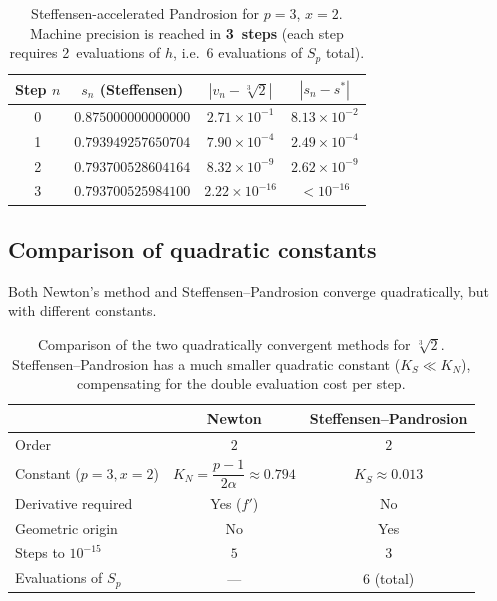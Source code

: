 \documentclass[11pt,a4paper]{article}
\theoremstyle{definition}
\newcommand{\cbrt}[1]{\sqrt[3]{#1}}
\begin{document}
\begin{table}[h]
\centering
\begin{tabular}{cccc}
\toprule
Step $n$ & $s_n$ (Steffensen) & $|v_n - \cbrt{2}|$ & $|s_n - s^*|$ \\
\midrule
0 & $0.875000000000000$ & $2.71 \times 10^{-1}$ & $8.13 \times 10^{-2}$ \\
1 & $0.793949257650704$ & $7.90 \times 10^{-4}$ & $2.49 \times 10^{-4}$ \\
2 & $0.793700528604164$ & $8.32 \times 10^{-9}$ & $2.62 \times 10^{-9}$ \\
3 & $0.793700525984100$ & $2.22 \times 10^{-16}$ & $< 10^{-16}$ \\
\bottomrule
\end{tabular}
\caption{Steffensen-accelerated Pandrosion for $p=3$, $x=2$. Machine precision is reached in \textbf{3~steps} (each step requires 2~evaluations of $h$, i.e.\ 6 evaluations of $S_p$ total).}
\end{table}

\subsection{Comparison of quadratic constants}

Both Newton's method and Steffensen--Pandrosion converge quadratically, but with different constants.

\begin{table}[h]
\centering
\renewcommand{\arraystretch}{1.3}
\begin{tabular}{lcc}
\toprule
& \textbf{Newton} & \textbf{Steffensen--Pandrosion} \\
\midrule
Order & $2$ & $2$ \\
Constant ($p\!=\!3, x\!=\!2$) & $K_N = \dfrac{p-1}{2\alpha} \approx 0.794$ & $K_S \approx 0.013$ \\
Derivative required & Yes ($f'$) & No \\
Geometric origin & No & Yes \\
Steps to $10^{-15}$ & $5$ & $3$ \\
Evaluations of $S_p$ & --- & $6$ (total) \\
\bottomrule
\end{tabular}
\caption{Comparison of the two quadratically convergent methods for $\cbrt{2}$. Steffensen--Pandrosion has a much smaller quadratic constant ($K_S \ll K_N$), compensating for the double evaluation cost per step.}
\end{table}
\end{document}

